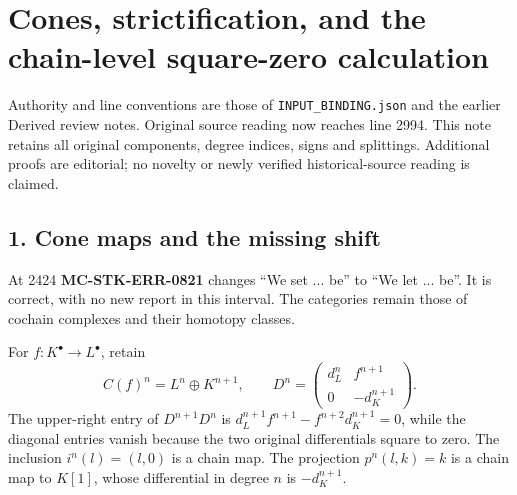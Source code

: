 \documentclass[11pt]{article}
\begin{document}
\section{\texorpdfstring{Cones,\allowbreak{} strictification,\allowbreak{} and the chain-level square-zero calculation}{  and the chain-level square-zero calculation}}\label{proofs-2419-2994-cones-strictification-and-the-chain-level-square-zero-calculation}

Authority and line conventions are those of \texttt{INPUT\_\allowbreak{}BINDING.\allowbreak{}json} and the earlier Derived review notes. Original source reading now reaches line 2994. This note retains all original components,\allowbreak{} degree indices,\allowbreak{} signs and splittings. Additional proofs are editorial; no novelty or newly verified historical-source reading is claimed.

\subsection{1. Cone maps and the missing shift}\label{proofs-2419-2994-cone-maps-and-the-missing-shift}

At 2424 \textbf{MC-STK-ERR-0821} changes ``We set ... be'' to ``We let ... be''. It is correct,\allowbreak{} with no new report in this interval. The categories remain those of cochain complexes and their homotopy classes.

For \(f:K^\bullet\to L^\bullet\),\allowbreak{} retain \[
C(f)^n=L^n\oplus K^{n+1},\qquad
D^n=\begin{pmatrix}d_L^n&f^{n+1}\\0&-d_K^{n+1}\end{pmatrix}.
\] The upper-right entry of \(D^{n+1}D^n\) is \(d_L^{n+1}f^{n+1}-f^{n+2}d_K^{n+1}=0\),\allowbreak{} while the diagonal entries vanish because the two original differentials square to zero. The inclusion \(i^n(l)=(l,0)\) is a chain map. The projection \(p^n(l,k)=k\) is a chain map to \(K[1]\),\allowbreak{} whose differential in degree \(n\) is \(-d_K^{n+1}\).
\end{document}
